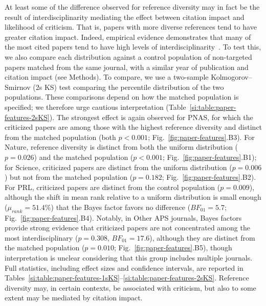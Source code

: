 \documentclass[12pt,a4paper]{article}
\numberwithin{equation}{section}
\def\methods{Methods}
\begin{document}
At least some of the difference observed for reference diversity may in fact be the result of interdisciplinarity mediating the effect between citation impact and likelihood of criticism.
That is, papers with more diverse references tend to have greater citation impact. 
Indeed, empirical evidence demonstrates that many of the most cited papers tend to have high levels of interdisciplinarity~\cite{chen_2015_interdisciplinary, yegros-yegros_2015_interdisciplinarity}.
To test this, we also compare each distribution against a control population of non-targeted papers matched from the same journal, with a similar year of publication and citation impact (see \methods). 
To compare, we use a two-sample Kolmogorov–Smirnov (2s KS) test comparing the percentile distribution of the two populations.
These comparisons depend on how the matched population is specified; we therefore urge cautious interpretation (Table~\ref*{si:table:paper-features-2sKS}).
The strongest effect is again observed for PNAS, for which the criticized papers are among those with the highest reference diversity and distinct from the matched population (both $p < 0.001$; Fig.~\ref*{fig:paper-features}.B3).
For Nature, reference diversity is distinct from both the uniform distribution ($p = 0.026$) and the matched population ($p < 0.001$; Fig.~\ref*{fig:paper-features}.B1); for Science, criticized papers are distinct from the uniform distribution ($p = 0.006$) but not from the matched population ($p = 0.182$; Fig.~\ref*{fig:paper-features}.B2).
For PRL, criticized papers are distinct from the control population ($p = 0.009$), although the shift in mean rank relative to a uniform distribution is small enough ($\mu_{rank} = 51.4\%$) that the Bayes factor favors no difference ($BF_{01} = 5.7$; Fig.~\ref*{fig:paper-features}.B4).
Notably, in Other APS journals, Bayes factors provide strong evidence that criticized papers are not concentrated among the most interdisciplinary ($p = 0.308$, $BF_{01} = 17.6$), although they are distinct from the matched population ($p = 0.010$; Fig.~\ref*{fig:paper-features}.B5), though interpretation is unclear considering that this group includes multiple journals.
Full statistics, including effect sizes and confidence intervals, are reported in Tables~\ref*{si:table:paper-features-1sKS}--\ref*{si:table:paper-features-2sKS}.
Reference diversity may, in certain contexts, be associated with criticism, but also to some extent may be mediated by citation impact.
\end{document}
